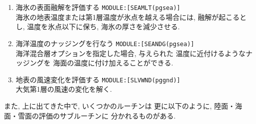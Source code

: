 \begin{enumerate}
  \item 海氷の表面融解を評価する \texttt{MODULE:[SEAMLT(pgsea)]} \\
            海氷の地表温度または第1層温度が氷点を越える場合には,
            融解が起こるとし, 温度を氷点以下に保ち,
            海氷の厚さを減少させる. 

  \item 海洋温度のナッジングを行なう \texttt{MODULE:[SEANDG(pgsea)]} \\
            海洋混合層オプションを指定した場合, 与えられた
            温度に近付けるようなナッジングを
            海面の温度に付け加えることができる.

  \item 地表の風速変化を評価する \texttt{MODULE:[SLVWND(pggnd)]}  \\
            大気第1層の風速の変化を解く.
\end{enumerate}

また, 上に出てきた中で, いくつかのルーチンは
更に以下のように, 陸面・海面・雪面の評価のサブルーチンに
分かれるものがある.

